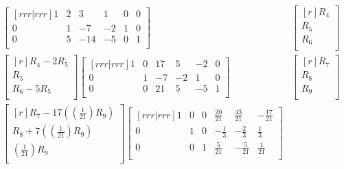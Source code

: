 \documentclass[12pt]{article}
\begin{document}
\begin{enumerate}
\begin{align*}
\begin{bmatrix}[rrr|rrr]
	1 & 2 & 3 & 1 & 0 & 0\\
	0 & 1 & -7 & -2 & 1 & 0\\
	0 & 5 & -14 & -5 & 0 & 1\\
	\end{bmatrix}&
	\begin{bmatrix}[r] R_4\\ R_5\\ R_6\\ \end{bmatrix}\\
	\begin{bmatrix}[r]
	R_4 - 2R_5\\
	R_5\\
	R_6 - 5R_5\\
	\end{bmatrix}
	\begin{bmatrix}[rrr|rrr]
	1 & 0 & 17 & 5 & -2 & 0\\
	0 & 1 & -7 & -2 & 1 & 0\\
	0 & 0 & 21 & 5 & -5 & 1\\
	\end{bmatrix}&
	\begin{bmatrix}[r] R_7\\ R_8\\ R_9\\ \end{bmatrix}\\
	\begin{bmatrix}[r]
	R_7 - 17((\frac{1}{21})R_9)\\
	R_8 + 7((\frac{1}{21})R_9)\\
	(\frac{1}{21})R_9\\
	\end{bmatrix}
	\begin{bmatrix}[rrr|rrr]
	1 & 0 & 0 & \frac{20}{21} & \frac{43}{21} & -\frac{17}{21}\\
	0 & 1 & 0 & -\frac{1}{3} & -\frac{2}{3} & \frac{1}{3}\\
	0 & 0 & 1 & \frac{5}{21} & -\frac{5}{21} & \frac{1}{21}\\
	\end{bmatrix}&	
	\end{align*}


\end{enumerate}
\end{document}
